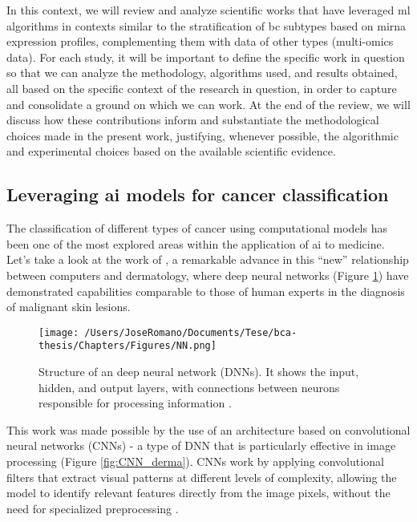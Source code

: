 In this context, we will review and analyze scientific works that have
leveraged \gls{ml} algorithms in contexts similar to the stratification of
\gls{bc} subtypes based on \gls{mirna} expression profiles, complementing them
with data of other types (multi-omics data). For each study, it will be
important to define the specific work in question so that we can analyze the
methodology, algorithms used, and results obtained, all based on the specific
context of the research in question, in order to capture and consolidate a
ground on which we can work. At the end of the review, we will discuss how
these contributions inform and substantiate the methodological choices made in
the present work, justifying, whenever possible, the algorithmic and
experimental choices based on the available scientific evidence.

\subsection{Leveraging \gls{ai} models for cancer classification}

The classification of different types of cancer using computational models has
been one of the most explored areas within the application of \gls{ai} to
medicine. Let's take a look at the work of
\textcite{ai_in_dermacancer_esteva2017}, a remarkable advance in this “new”
relationship between computers and dermatology, where deep neural networks
(Figure \ref{fig:DNN}) have demonstrated capabilities comparable to those of
human experts in the diagnosis of malignant skin lesions.

\begin{figure}[htbp]
  \centering
  \texttt{[image: /Users/JoseRomano/Documents/Tese/bca-thesis/Chapters/Figures/NN.png]}
  \caption{Structure of an deep neural network (DNNs). It shows the input, hidden, and output layers, with connections between neurons responsible for processing information \cite{analyticsvidhya_image}.}
  \label{fig:DNN}
\end{figure}

This work was made possible by the use of an architecture based on
convolutional neural networks (CNNs) - a type of DNN that is particularly
effective in image processing (Figure \ref{fig:CNN_derma}). CNNs work by
applying convolutional filters that extract visual patterns at different levels
of complexity, allowing the model to identify relevant features directly from
the image pixels, without the need for specialized preprocessing
\cite{CNN_Albawi2017}.

